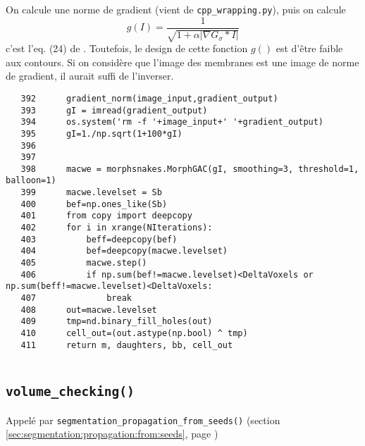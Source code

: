 \documentclass{article}
\def \mycolor {red}
\begin{document}
\color{\mycolor}
On calcule une norme de gradient (vient de \verb|cpp_wrapping.py|), puis on calcule 
\begin{displaymath}
g(I) = \frac{1}{\sqrt{1+ \alpha |\nabla G_{\sigma}* I|}}
\end{displaymath}
c'est l'eq. (24) de \cite{marquez-neil:pami:2014}. Toutefois, le design de cette fonction $g()$ est d'\^etre faible aux contours. Si on consid\`ere que l'image des membranes est une image de norme de gradient, il aurait suffi de l'inverser. 
\color{black}
\begin{verbatim} 
   392	    gradient_norm(image_input,gradient_output)
   393	    gI = imread(gradient_output)
   394	    os.system('rm -f '+image_input+' '+gradient_output)
   395	    gI=1./np.sqrt(1+100*gI)
   396		
   397		
   398	    macwe = morphsnakes.MorphGAC(gI, smoothing=3, threshold=1, balloon=1)
   399	    macwe.levelset = Sb
   400	    bef=np.ones_like(Sb)
   401	    from copy import deepcopy
   402	    for i in xrange(NIterations):
   403	        beff=deepcopy(bef)
   404	        bef=deepcopy(macwe.levelset)
   405	        macwe.step()
   406	        if np.sum(bef!=macwe.levelset)<DeltaVoxels or np.sum(beff!=macwe.levelset)<DeltaVoxels:
   407	            break
   408	    out=macwe.levelset
   409	    tmp=nd.binary_fill_holes(out)
   410	    cell_out=(out.astype(np.bool) ^ tmp)
   411	    return m, daughters, bb, cell_out
  
\end{verbatim}





\subsection{\texttt{volume\_checking()}}
\label{sec:volume:checking}

\color{\mycolor}
Appel\'e par \texttt{segmentation\_propagation\_from\_seeds()}
(section \ref{sec:segmentation:propagation:from:seeds}, page \pageref{sec:segmentation:propagation:from:seeds})
\color{black}
\end{document}
